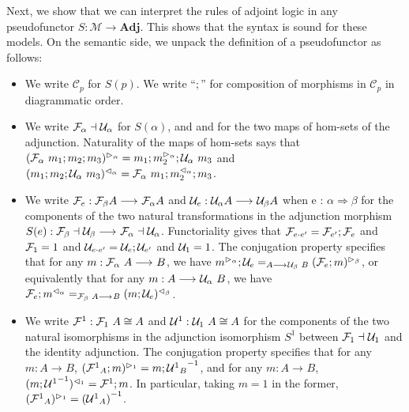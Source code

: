 \documentclass{drl-common/llncs}
\newcommand{\inv}[1]{\ensuremath{{#1}^{-1}}}
\newcommand{\C}{\ensuremath{\mathcal{C}}}
\newcommand{\M}{\ensuremath{\mathcal{M}}}
\newcommand{\la}{\ensuremath{\dashv}}
\newcommand{\arrow}[3]{\ensuremath{#2 \longrightarrow_{#1} #3}}
\newcommand{\tc}[2]{\ensuremath{#1 \Rightarrow #2}}
\newcommand{\Adj}{\textbf{Adj}}
\newcommand\compv[2]{\ensuremath{#1 \cdot #2}}
\begin{document}
Next, we show that we can interpret the rules of adjoint logic in any
pseudofunctor $S : \M \to \Adj$.  This shows that the syntax is sound
for these models.  On the semantic side, we unpack the definition of a
pseudofunctor as follows:
\begin{itemize}
\item We write $\C_p$ for $S(p)$.  We write ``$;$'' for composition of
  morphisms in $\C_p$ in diagrammatic order.

\item We write $\semFo{\alpha}{} \la \semUo{\alpha}$ for $S(\alpha)$,
  and \semltor{-}{\alpha} and \semrtol{-}{\alpha} for the two maps of
  hom-sets of the adjunction.  Naturality of the maps of hom-sets says
  that $(\mathcal{F}_{\alpha} \,\, m_1;m_2;m_3)^{\vartriangleright_{\alpha}} =
  m_1;m_2^{\vartriangleright_{\alpha}};\mathcal{U}_{\alpha} \,\, m_3$ and
  $(m_1;m_2;\mathcal{U}_{\alpha} \,\, m_3)^{\vartriangleleft_{\alpha}} =
  \mathcal{F}_{\alpha} \,\, m_1;{m_2^{\vartriangleleft_{\alpha}}};{m_3}$.

\item We write $\semFo{e} : \arrow{}{\semFo \beta A}{\semFo \alpha A}$
  and $\semUo{e} : \arrow{}{\semUo \alpha A}{\semUo \beta A}$ when {e :
    \tc{\alpha}{\beta}} for the components of the two natural
  transformations in the adjunction morphism $S(e) :
  \arrow{}{\semFo{\beta}{} \la \semUo{\beta}} {\semFo{\alpha}{} \la
    \semUo{\alpha}}$.  Functoriality gives that $\semFo{\compv{e}{e'}} =
  \semFo{e'};\semFo{e}$ and ${\mathcal{F}_{1}} = 1$ and $\semUo{\compv{e}{e'}} =
  \semUo{e};\semUo{e'}$ and $\mathcal{U}_{1} = 1$.  The conjugation property 
  specifies that for any $m :
  \arrow{}{\semF{\alpha}{A}}{B}$, we have $\semltor{m}{\alpha};\semUo{e}
  =_{\arrow{}{A}{\semU{\beta}{B}}} \semltor{(\semFo{e};m)}{\beta}$, or
  equivalently that for any $m : \arrow{}{{A}}{\semU{\alpha} B}$, we
  have $\semFo{e};\semrtol{m}{\alpha} =_{\arrow{}{\semF \beta A}{B}}
  \semrtol{(m;\semUo{e})}{\beta}$.

\item We write ${\mathcal{F}^1} : \mathcal{F}_{1} \,\, A \cong A$ and ${\mathcal{U}^1} :
  \mathcal{U}_{1} \,\, A \cong A$ for the components of the two natural isomorphisms
  in the adjunction isomorphism $S^1$ between $\semFo{1}{} \la
  \semUo{1}$ and the identity adjunction.  The conjugation property
  specifies that for any $m : \arrow{}{A}{B}$, $\ltor{(\semFone_A;m)}{1}
  = m;\inv{\semUone_B}$, and for any $m : \arrow{}{A}{B}$,
  $\semrtol{(m;\inv{\semUone})}{1} = \semFone;m$.  In particular, taking
  $m = 1$ in the former, $\ltor{(\semFone_A)}{{1}} =
  \inv{(\semUone_A)}$.


\end{itemize}
\end{document}
